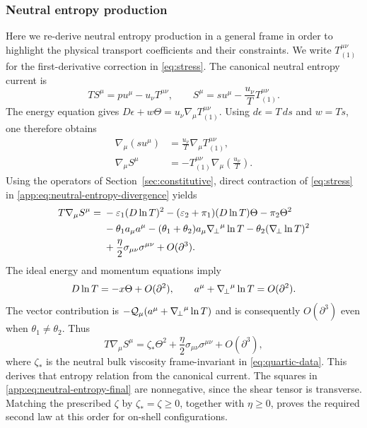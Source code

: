\subsubsection{Neutral entropy production}\label{app:neutral-entropy}
Here we re-derive neutral entropy production in a general frame in order to highlight the physical transport coefficients and their constraints. We write $T_{(1)}^{\mu\nu}$ for the first-derivative correction in
\eqref{eq:stress}. The canonical neutral entropy current is
\begin{equation}
 TS^\mu=p u^\mu-u_\nu T^{\mu\nu},\qquad
 S^\mu=su^\mu-\frac{u_\nu}{T}T_{(1)}^{\mu\nu}.
\end{equation}
The energy equation gives
$D\epsilon+w\Theta=u_\nu\nabla_\mu T_{(1)}^{\mu\nu}$.
Using $d\epsilon=T\,ds$ and $w=Ts$, one therefore obtains
\begin{align}
 \nabla_\mu(su^\mu)&=
       \frac{u_\nu}{T}\nabla_\mu T_{(1)}^{\mu\nu},\\
 \nabla_\mu S^\mu&=-T_{(1)}^{\mu\nu}
                      \nabla_\mu\left(\frac{u_\nu}{T}\right).
 \label{app:eq:neutral-entropy-divergence}
\end{align}
Using the operators of Section~\ref{sec:constitutive}, direct contraction
of \eqref{eq:stress} in \eqref{app:eq:neutral-entropy-divergence} yields
\begin{align}
 T\nabla_\mu S^\mu={}&-\varepsilon_1(D\ln T)^2
 -(\varepsilon_2+\pi_1)(D\ln T)\Theta-\pi_2\Theta^2\nonumber\\
 &-\theta_1a_\mu a^\mu-(\theta_1+\theta_2)a_\mu{\nabla_{\!\perp}}^\mu\ln T
       -\theta_2({\nabla_{\!\perp}}\ln T)^2\nonumber\\
 &+\frac\eta2\sigma_{\mu\nu}\sigma^{\mu\nu}+O(\partial^3).
\end{align}
The ideal energy and momentum equations imply
\begin{equation}
 D\ln T=-x\Theta+O(\partial^2),\qquad
 a^\mu+{\nabla_{\!\perp}}^\mu\ln T=O(\partial^2).
\end{equation}
The vector contribution is $-\mathcal Q_\mu(a^\mu+{\nabla_{\!\perp}}^\mu\ln T)$ and is consequently
$O(\partial^3)$ even when ${\theta_1}\ne{\theta_2}$. Thus
\begin{equation}\label{app:eq:neutral-entropy-final}
 T\nabla_\mu S^\mu=\zeta_*\Theta^2
       +\frac\eta2\sigma_{\mu\nu}\sigma^{\mu\nu}+O(\partial^3),
\end{equation}
where $\zeta_*$ is the neutral bulk viscosity frame-invariant in
\eqref{eq:quartic-data}. This derives that entropy relation from the
canonical current.
The squares in \eqref{app:eq:neutral-entropy-final} are nonnegative, since the shear
tensor is transverse. Matching the prescribed $\zeta$ by
$\zeta_*=\zeta\geq0$, together with $\eta\geq0$, proves the required
second law at this order for on-shell configurations.


